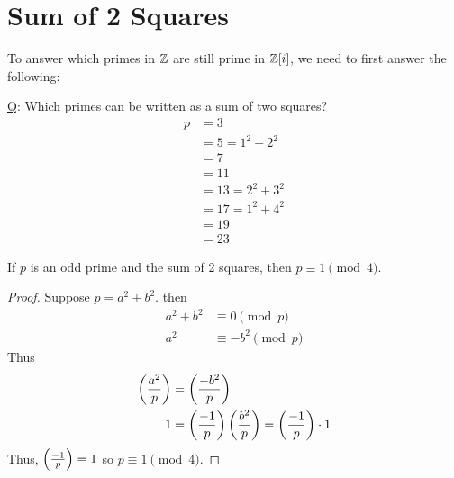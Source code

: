 \section{Sum of 2 Squares}
    To answer which primes in $\mathbb{Z}$ are still prime in $\mathbb{Z}[i]$,
    we need to first answer the following: 

    \underline{Q}: Which primes can be written as a sum of two squares?
    \begin{align*}
        p &= 3 \\
        &= 5 = 1^2+2^2 \\
        &= 7 \\
        &= 11 \\
        &= 13 = 2^2 + 3^2 \\
        &= 17 = 1^2 + 4^2 \\
        &= 19 \\
        &= 23
    \end{align*}
    \begin{theorem}
        If $p$ is an odd prime and the sum of 2 squares, 
        then $p\equiv 1\pmod{4}$.
        \begin{proof}
            Suppose $p=a^2+b^2$. then
            \begin{align*}
                a^2+b^2 &\equiv 0\pmod{p} \\
                a^2 &\equiv -b^2\pmod{p}
            \end{align*}
            Thus
            \begin{align*}
                \left( \frac{a^2}{p} \right)  &= \left( \frac{-b^2}{p} \right)  \\
                1 &= \left( \frac{-1}{p} \right) \left( \frac{b^2}{p} \right)  = \left( \frac{-1}{p} \right) \cdot 1
            \end{align*}
            Thus, $\left( \frac{-1}{p} \right)  = 1$ so $p\equiv 1\pmod{4}$.
        \end{proof}
    \end{theorem}

